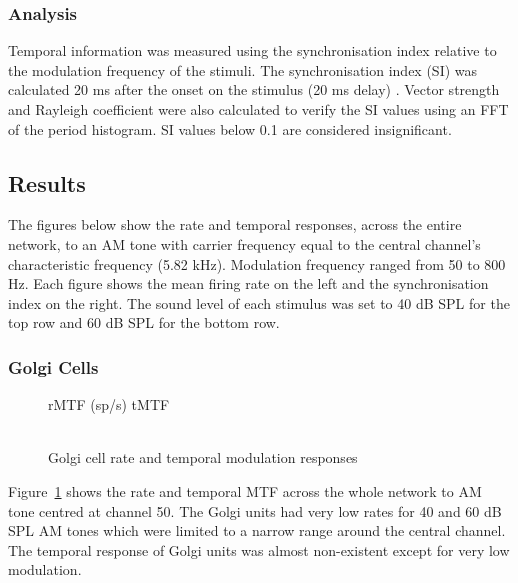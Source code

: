 \subsubsection{Analysis}

Temporal information was measured using the synchronisation index
relative to the modulation frequency of the stimuli.  The
synchronisation index (SI) was calculated 20 ms after the onset on
the stimulus (20 ms delay) \cite{KajikawaHackett:2005}. Vector
strength and Rayleigh coefficient were also calculated to verify
the SI values using an FFT of the period histogram.  SI values
below 0.1 are considered insignificant.

\subsection{Results}

The figures below show the rate and temporal responses, across the
entire network, to an AM tone with carrier frequency equal to the
central channel's characteristic frequency (5.82 kHz).
Modulation frequency ranged from 50 to 800 Hz.  Each figure shows the mean
firing rate on the left and the synchronisation index on the right.
The sound level of each stimulus was set to 40 dB SPL for the top
row and 60 dB SPL for the bottom row.  

\subsubsection{Golgi Cells}
\begin{figure}[tb]
\centering 
\caption{Golgi cell rate and temporal modulation responses}\label{fig:G}
{\hspace{0.2\columnwidth}rMTF (sp/s) \hspace{0.35\columnwidth} tMTF}\\
\\
\end{figure}
Figure~\ref{fig:G} shows the rate and temporal MTF across the whole
network to AM tone centred at channel 50. The Golgi units had very
low rates for 40 and 60 dB SPL AM tones which were limited to a
narrow range around the central channel.  The temporal response of
Golgi units was almost non-existent except for very low modulation.

